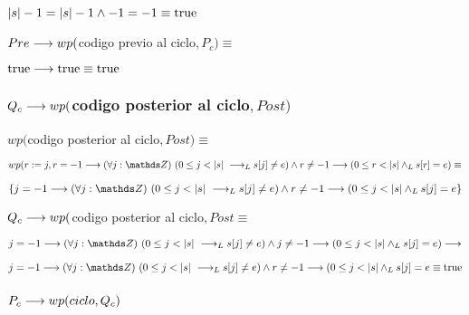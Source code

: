 \documentclass{article}
\begin{document}
$ |s| -1 = |s| - 1 \wedge -1 = -1 \equiv \mathrm{true} $

$Pre \longrightarrow wp($codigo previo al ciclo$, P_{c}) \equiv$

$\mathrm{true} \longrightarrow \mathrm{true} \equiv \mathrm{true}$

\subsubsection*{$Q_{c} \longrightarrow wp($codigo posterior al ciclo$, Post)$}

$wp($codigo posterior al ciclo$, Post) \equiv$

$wp(r:= j, r = -1 \implica \paraTodo{j}{(0}{\longitud{s}} \implicaLuego s[j] \neq e) \wedge r \neq -1 \implica (0 \leq r < \longitud{s}\yLuego s[r]=e) \equiv$

$\{ j = -1 \implica \paraTodo{j}{(0}{\longitud{s}} \implicaLuego s[j] \neq e) \wedge r \neq -1 \implica (0 \leq j < \longitud{s}\yLuego s[j]=e \}$

$Q_{c} \longrightarrow wp($codigo posterior al ciclo$, Post \equiv$

$j = -1 \implica \paraTodo{j}{(0}{\longitud{s}} \implicaLuego s[j] \neq e) \wedge j \neq -1 \implica (0 \leq j < \longitud{s}\yLuego s[j]=e) \implica$

$j = -1 \implica \paraTodo{j}{(0}{\longitud{s}} \implicaLuego s[j] \neq e) \wedge r \neq -1 \implica (0 \leq j < \longitud{s}\yLuego s[j]=e \equiv \True$

\subsubsection*{$P_{c} \longrightarrow wp(ciclo, Q_{c})$}
\end{document}
